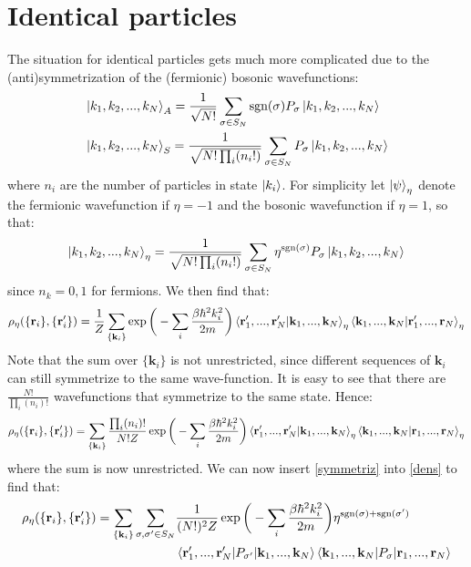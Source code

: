 \documentclass[a4paper,11pt,oneside]{book}
\begin{document}
\section{Identical particles}
The situation for identical particles gets much more complicated due to the (anti)symmetrization of the (fermionic) bosonic wavefunctions:
\begin{align}
    &\ket{k_1,k_2,...,k_N}_A = \frac{1}{\sqrt{N!}}\sum_{\sigma \in S_N} \text{sgn}(\sigma)P_\sigma \ket{k_1,k_2,...,k_N}\\
    &\ket{k_1,k_2,...,k_N}_S = \frac{1}{\sqrt{N! \prod_i (n_i!)}}\sum_{\sigma \in S_N} P_\sigma \ket{k_1,k_2,...,k_N}
\end{align} 
where $n_i$ are the number of particles in state $\ket{k_i}$. For simplicity let $\ket{\psi}_\eta$ denote the fermionic wavefunction if $\eta=-1$ and the bosonic wavefunction if $\eta=1$, so that:
\begin{equation}
    \ket{k_1,k_2,...,k_N}_\eta = \frac{1}{\sqrt{N! \prod_i (n_i!)}}\sum_{\sigma \in S_N} \eta^{\text{sgn}(\sigma)}P_\sigma \ket{k_1,k_2,...,k_N}
\end{equation}
since $n_k=0,1$ for fermions. We then find that:
\begin{equation}\label{symmetriz}
    \rho_\eta(\{\textbf{r}_i\},\{\textbf{r}'_i\}) =  \frac{1}{Z}\sum_{\{\textbf{k}_i\}} \exp\bigg(-\sum_i \frac{\beta \hbar^2 k_i^2}{2m}\bigg)\braket{\textbf{r}_1',...,\textbf{r}_N'|\textbf{k}_1,...,\textbf{k}_N}_\eta \braket{\textbf{k}_1,...,\textbf{k}_N|\textbf{r}_1',...,\textbf{r}_N}_\eta 
\end{equation}
Note that the sum over $\{\textbf{k}_i\}$ is not unrestricted, since different sequences of $\textbf{k}_i$ can still symmetrize to the same wave-function. It is easy to see that there are $\frac{N!}{\prod_i (n_i)!}$ wavefunctions that symmetrize to the same state. Hence:
\begin{equation}\label{dens}
    \rho_\eta(\{\textbf{r}_i\},\{\textbf{r}'_i\})  = \sum_{\{\textbf{k}_i\}} \frac{\prod_i (n_i)!}{N!Z} \exp\bigg(-\sum_i \frac{\beta \hbar^2 k_i^2}{2m}\bigg)\braket{\textbf{r}_1',...,\textbf{r}_N'|\textbf{k}_1,...,\textbf{k}_N}_\eta \braket{\textbf{k}_1,...,\textbf{k}_N|\textbf{r}_1,...,\textbf{r}_N}_\eta 
\end{equation}
where the sum is now unrestricted. We can now insert \eqref{symmetriz} into  \eqref{dens} to find that:
\begin{align}
      \rho_\eta(\{\textbf{r}_i\},\{\textbf{r}'_i\})  = \sum_{\{\textbf{k}_i\}}\sum_{\sigma,\sigma' \in S_N}& \frac{1}{(N!)^2Z} \exp\bigg(-\sum_i \frac{\beta \hbar^2 k_i^2}{2m}\bigg)\eta^{\text{sgn}(\sigma)+\text{sgn}(\sigma')}\\
      &\braket{\textbf{r}_1',...,\textbf{r}_N'|P_{\sigma'}|\textbf{k}_1,...,\textbf{k}_N}\braket{\textbf{k}_1,...,\textbf{k}_N|P_{\sigma}|\textbf{r}_1,...,\textbf{r}_N} \notag
\end{align}
\end{document}
